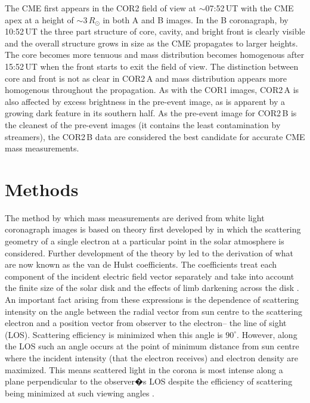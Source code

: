 \documentclass{emulateapj}
\begin{document}
	The CME first appears in the COR2 field of view at $\sim$07:52\,UT with the CME apex at a height of $\sim$3\,$R_{\odot}$ in both A and B images. In the B coronagraph, by 10:52\,UT the three part structure of core, cavity, and bright front is clearly visible and the overall structure grows in size as the CME propagates to larger heights. The core becomes more tenuous and mass distribution becomes homogenous after 15:52\,UT when the front starts to exit the field of view. The distinction between core and front is not as clear in COR2\,A and mass distribution appears more homogenous throughout the propagation. As with the COR1 images, COR2\,A is also affected by excess brightness in the pre-event image, as is apparent by a growing dark feature in its southern half. As the pre-event image for COR2\,B is the cleanest of the pre-event images (it contains the least contamination by streamers), the COR2\,B data are considered the best candidate for accurate CME mass measurements. 

\section{Methods}

The method by which mass measurements are derived from white light coronagraph images is based on theory first developed by \citet{min30} in which the scattering geometry of a single electron at a particular point in the solar atmosphere is considered. Further development of the theory by \citet{vdeh50} led to the derivation of what are now known as the van de Hulst coefficients. The coefficients treat each component of the incident electric field vector separately and take into account the finite size of the solar disk and the effects of limb darkening across the disk \citep{min30, bil66, how09}. An important fact arising from these expressions is the dependence of scattering intensity on the angle between the radial vector from sun centre to the scattering electron and a position vector from observer to the electron-- the line of sight (LOS). Scattering efficiency is minimized when this angle is $90^{\circ}$. However, along the LOS such an angle occurs at the point of minimum distance from sun centre where the incident intensity (that the electron receives) and electron density are maximized. This means scattered light in the corona is most intense along a plane perpendicular to the observer�s LOS despite the efficiency of scattering being minimized at such viewing angles \citep{how09}.
\end{document}

